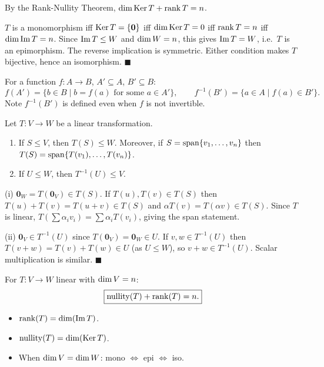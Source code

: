 \begin{proofbox}
By the Rank-Nullity Theorem, $\operatorname{dim}\operatorname{Ker} T + \operatorname{rank} T = n$.

$T$ is a monomorphism iff $\operatorname{Ker} T=\{\mathbf{0}\}$ iff $\operatorname{dim}\operatorname{Ker} T=0$ iff
$\operatorname{rank} T=n$ iff $\operatorname{dim}\operatorname{Im} T=n$.  Since $\operatorname{Im} T\le W$ and $\operatorname{dim} W=n$, this
gives $\operatorname{Im} T=W$, i.e.\ $T$ is an epimorphism.  The reverse implication is
symmetric.  Either condition makes $T$ bijective, hence an isomorphism.
\hfill$\blacksquare$
\end{proofbox}

\begin{tipbox}
For a function $f:A\to B$, $A'\subseteq A$, $B'\subseteq B$:
\[
    f(A') = \{b\in B \mid b=f(a) \text{ for some } a\in A'\},
    \qquad
    f^{-1}(B') = \{a\in A \mid f(a)\in B'\}.
\]
Note $f^{-1}(B')$ is defined even when $f$ is not invertible.
\end{tipbox}

\begin{propbox}
\label{prop:lt-subspace-preserved}
Let $T:V\to W$ be a linear transformation.
\begin{enumerate}[label=(\roman*)]
    \item If $S\leq V$, then $T(S)\leq W$.  Moreover, if
          $S=\operatorname{span}\{v_1,\ldots,v_n\}$ then $T(S)=\operatorname{span}\{T(v_1),\ldots,T(v_n)\}$.
    \item If $U\leq W$, then $T^{-1}(U)\leq V$.
\end{enumerate}
\end{propbox}

\begin{proofbox}
(i) $\mathbf{0}_W=T(\mathbf{0}_V)\in T(S)$.  If $T(u),T(v)\in T(S)$ then
$T(u)+T(v)=T(u+v)\in T(S)$ and $\alpha T(v)=T(\alpha v)\in T(S)$.  Since
$T$ is linear, $T(\sum\alpha_i v_i)=\sum\alpha_i T(v_i)$, giving the span
statement.

(ii) $\mathbf{0}_V\in T^{-1}(U)$ since $T(\mathbf{0}_V)=\mathbf{0}_W\in U$.
If $v,w\in T^{-1}(U)$ then $T(v+w)=T(v)+T(w)\in U$ (as $U\le W$), so
$v+w\in T^{-1}(U)$.  Scalar multiplication is similar.
\hfill$\blacksquare$
\end{proofbox}

\begin{flowbox}
For $T:V\to W$ linear with $\operatorname{dim} V=n$:
\[
    \boxed{\operatorname{nullity}(T) + \operatorname{rank}(T) = n.}
\]
\begin{itemize}
    \item $\operatorname{rank}(T) = \operatorname{dim}(\operatorname{Im} T)$.
    \item $\operatorname{nullity}(T) = \operatorname{dim}(\operatorname{Ker} T)$.
    \item When $\operatorname{dim} V=\operatorname{dim} W$: mono $\Leftrightarrow$ epi $\Leftrightarrow$ iso.
\end{itemize}
\end{flowbox}
